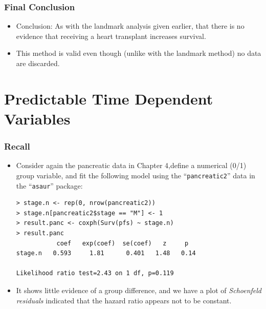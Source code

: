 \documentclass{beamer}
\newcommand{\empr}[1]{{\emph{\color{red}#1}}}
\begin{document}
\pagebreak
\begin{frame}[fragile]
\frametitle{Final Conclusion}
\begin{itemize}
\begin{Verbatim}
> summary(coxph(Surv(tstart, tstop, death) ~ trans + surgery +
age, data=jasa.counting))
   n= 170, number of events= 75
             coef      exp(coef)     se(coef)      z      Pr(>|z|)
trans      0.01405      1.01415      0.30822     0.046     0.9636
surgery   -0.77326      0.46150      0.35966    -2.150     0.0316 * 
age        0.03055      1.03103      0.01389     2.199     0.0279 * 
---
Signif. codes: 0 *** 0.001 ** 0.01 * 0.05 . 0.1 
\end{Verbatim}
\item Conclusion: As with the landmark analysis given earlier, that there is no evidence that receiving a heart transplant increases survival. 
\item This method is valid even though (unlike with the landmark method) no data are discarded. 
\end{itemize}
\end{frame}

\section{Predictable Time Dependent Variables}
\begin{frame}[fragile]
\frametitle{Recall}
\begin{itemize}
\item Consider again the pancreatic data in Chapter 4,define a numerical (0/1) group variable, and fit the following model using the ``\texttt{pancreatic2}'' data in the ``\texttt{asaur}'' package:
\begin{Verbatim}
> stage.n <- rep(0, nrow(pancreatic2))
> stage.n[pancreatic2$stage == "M"] <- 1
> result.panc <- coxph(Surv(pfs) ~ stage.n) 
> result.panc
           coef   exp(coef)  se(coef)   z     p 
stage.n   0.593     1.81      0.401   1.48   0.14

Likelihood ratio test=2.43 on 1 df, p=0.119
\end{Verbatim}
\item It shows little evidence of a group difference, and we have a plot of \empr{Schoenfeld residuals} indicated that the hazard ratio appears not to be constant.
\end{itemize}
\end{frame}
\end{document}
